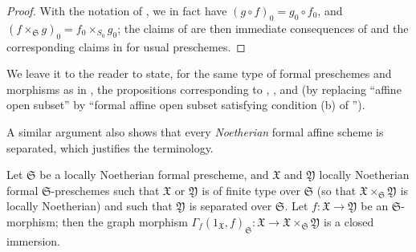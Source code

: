 \begin{proof}
\label{proof-1.10.15.3}
With the notation of , we in fact have $(g\circ f)_0=g_0\circ f_0$, and $(f\times_\mathfrak{S}g)_0=f_0\times_{S_0}g_0$;
the claims of  are then immediate consequences of  and the corresponding claims in  for usual preschemes.
\end{proof}

We leave it to the reader to state, for the same type of formal preschemes and morphisms as in , the propositions corresponding to , , and 
(by replacing ``affine open subset'' by ``formal affine open subset satisfying condition (b) of '').

A similar argument also shows that every \emph{Noetherian} formal affine scheme is separated, which justifies the terminology.

\begin{prop}[10.15.4]
\label{1.10.15.4}
Let $\mathfrak{S}$ be a locally Noetherian formal prescheme, and $\mathfrak{X}$ and $\mathfrak{Y}$ locally Noetherian formal $\mathfrak{S}$-preschemes such that $\mathfrak{X}$ or $\mathfrak{Y}$ is of finite type over $\mathfrak{S}$ (so that $\mathfrak{X}\times_\mathfrak{S}\mathfrak{Y}$ is locally Noetherian) and such that $\mathfrak{Y}$ is separated over $\mathfrak{S}$.
Let $f:\mathfrak{X}\to\mathfrak{Y}$ be an $\mathfrak{S}$-morphism; then the graph morphism $\Gamma_f(1_\mathfrak{X},f)_\mathfrak{S}:\mathfrak{X}\to\mathfrak{X}\times_\mathfrak{S}\mathfrak{Y}$ is a closed immersion.
\end{prop}

